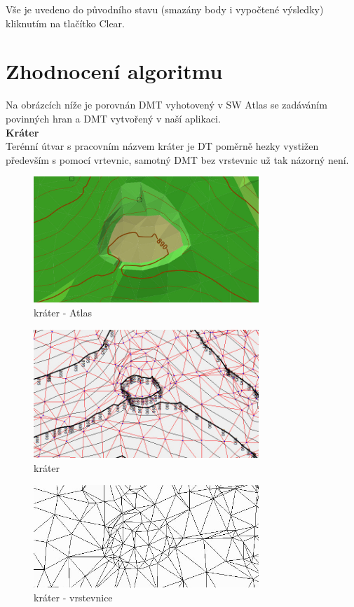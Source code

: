 \documentclass[a4paper, 12pt]{article}
\begin{document}
Vše je uvedeno do původního stavu (smazány body i vypočtené výsledky) kliknutím na tlačítko Clear.\\
\clearpage

\section{Zhodnocení algoritmu}

Na obrázcích níže je porovnán DMT vyhotovený v SW Atlas se zadáváním povinných hran a DMT vytvořený v naší aplikaci.\\


\textbf{Kráter}\\
Terénní útvar s pracovním názvem kráter je DT poměrně hezky vystižen především s pomocí vrtevnic, samotný DMT bez vrstevnic už tak názorný není.
 
\begin{figure}[h]
	\centering
	\includegraphics[width=8.5cm]{krater.jpg}
	\caption{kráter - Atlas}
\end{figure}

\begin{figure}[h]
	\centering
	\includegraphics[width=8.5cm]{krater_nas.jpg}
	\caption{kráter}
\end{figure}

\begin{figure}[h]
	\centering
	\includegraphics[width=8.5cm]{krater_nas2.jpg}
	\caption{kráter - vrstevnice}
\end{figure}
\clearpage
\end{document}
